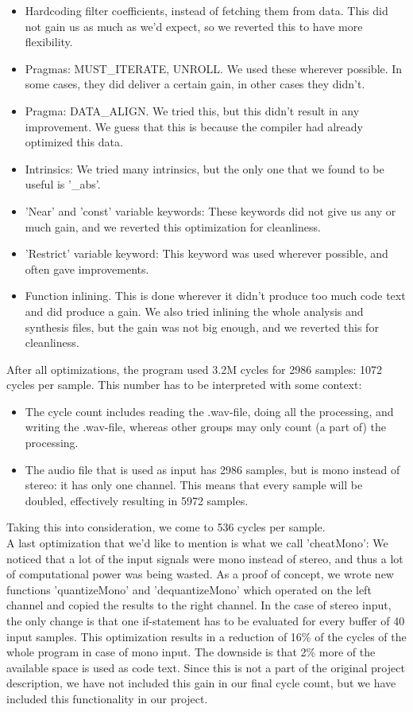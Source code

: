 \documentclass[a4paper]{article}
\begin{document}
\begin{itemize}
\item Hardcoding filter coefficients, instead of fetching them from data. This did not gain us as much as we'd expect, so we reverted this to have more flexibility.
\item Pragmas: MUST\_ITERATE, UNROLL. We used these wherever possible. In some cases, they did deliver a certain gain, in other cases they didn't.
\item Pragma: DATA\_ALIGN. We tried this, but this didn't result in any improvement. We guess that this is because the compiler had already optimized this data.
\item Intrinsics: We tried many intrinsics, but the only one that we found to be useful is '\_abs'.
\item 'Near' and 'const' variable keywords: These keywords did not give us any or much gain, and we reverted this optimization for cleanliness.
\item 'Restrict' variable keyword: This keyword was used wherever possible, and often gave improvements.
\item Function inlining. This is done wherever it didn't produce too much code text and did produce a gain. We also tried inlining the whole analysis and synthesis files, but the gain was not big enough, and we reverted this for cleanliness.
\end{itemize}

After all optimizations, the program used 3.2M cycles for 2986 samples: 1072 cycles per sample. This number has to be interpreted with some context:
\begin{itemize}
\item The cycle count includes reading the .wav-file, doing all the processing, and writing the .wav-file, whereas other groups may only count (a part of) the processing.
\item The audio file that is used as input has 2986 samples, but is mono instead of stereo: it has only one channel. This means that every sample will be doubled, effectively resulting in 5972 samples.
\end{itemize}
Taking this into consideration, we come to 536 cycles per sample. \\

A last optimization that we'd like to mention is what we call 'cheatMono': We noticed that a lot of the input signals were mono instead of stereo, and thus a lot of computational power was being wasted. As a proof of concept, we wrote new functions 'quantizeMono' and 'dequantizeMono' which operated on the left channel and copied the results to the right channel. In the case of stereo input, the only change is that one if-statement has to be evaluated for every buffer of 40 input samples. This optimization results in a reduction of 16\% of the cycles of the whole program in case of mono input. The downside is that 2\% more of the available space is used as code text. Since this is not a part of the original project description, we have not included this gain in our final cycle count, but we have included this functionality in our project. 
\end{document}
